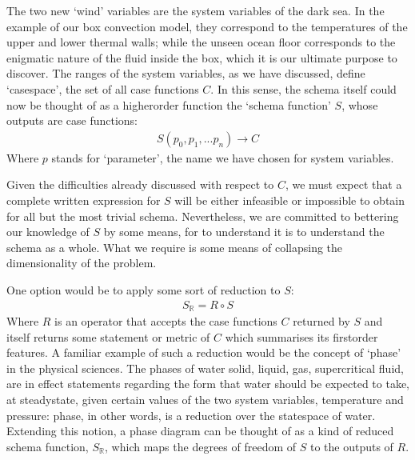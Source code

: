 \documentclass[letterpaper,10pt,english]{jupyterBook}
\begin{document}
\sphinxAtStartPar
The two new ‘wind’ variables are the system variables of the dark sea. In the example of our box convection model, they correspond to the temperatures of the upper and lower thermal walls; while the unseen ocean floor corresponds to the enigmatic nature of the fluid inside the box, which it is our ultimate purpose to discover. The ranges of the system variables, as we have discussed, define ‘case\sphinxhyphen{}space’, the set of all case functions \(C\). In this sense, the schema itself could now be thought of as a higher\sphinxhyphen{}order function \sphinxhyphen{} the ‘schema function’ \(S\), whose outputs are case functions:
\begin{equation*}
\begin{split} S \left( p_0, p_1, ... p_n \right) \to C \end{split}
\end{equation*}
\sphinxAtStartPar
Where \(p\) stands for ‘parameter’, the name we have chosen for system variables.

\sphinxAtStartPar
Given the difficulties already discussed with respect to \(C\), we must expect that a complete written expression for \(S\) will be either infeasible or impossible to obtain for all but the most trivial schema. Nevertheless, we are committed to bettering our knowledge of \(S\) by some means, for to understand it is to understand the schema as a whole. What we require is some means of collapsing the dimensionality of the problem.

\sphinxAtStartPar
One option would be to apply some sort of reduction to \(S\):
\begin{equation*}
\begin{split} S_{\mathbb{R}} = R \circ S \end{split}
\end{equation*}
\sphinxAtStartPar
Where \(R\) is an operator that accepts the case functions \(C\) returned by \(S\) and itself returns some statement or metric of \(C\) which summarises its first\sphinxhyphen{}order features. A familiar example of such a reduction would be the concept of ‘phase’ in the physical sciences. The phases of water \sphinxhyphen{} solid, liquid, gas, supercritical fluid,  \sphinxhyphen{} are in effect statements regarding the form that water should be expected to take, at steady\sphinxhyphen{}state, given certain values of the two system variables, temperature and pressure: phase, in other words, is a reduction over the state\sphinxhyphen{}space of water. Extending this notion, a phase diagram can be thought of as a kind of reduced schema function, \(S_{\mathbb{R}}\), which maps the degrees of freedom of \(S\) to the outputs of \(R\).
\end{document}
